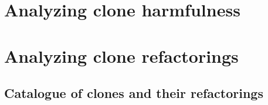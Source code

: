 \documentclass{report}
\theoremstyle{definition}
\theoremstyle{remark}
\begin{document}
\chapter{Analyzing clone harmfulness}


\chapter{Analyzing clone refactorings}


\section{Catalogue of clones and their refactorings}



\newpage


\end{document}
